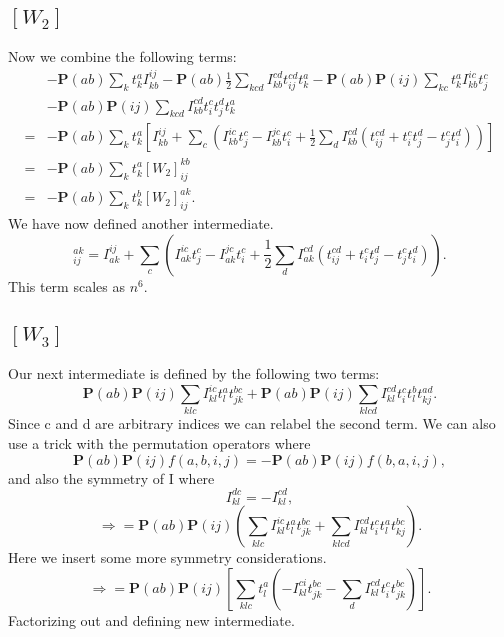 \documentclass[graybox,sectrefs,envcountresetchap,open=right]{svmonodo}
\begin{document}
\subsection{$[W_2]$}
Now we combine the following terms:
\begin{align}
& - \mathbf{P}(ab) \sum_k t_k^a I_{kb}^{ij}
- \mathbf{P}(ab) \frac{1}{2} \sum_{kcd} I_{kb}^{cd} t_{ij}^{cd} t_k^a
- \mathbf{P}(ab) \mathbf{P}(ij) \sum_{kc} t_k^a I_{kb}^{ic} t_j^c 
\nonumber \\
& - \mathbf{P}(ab) \mathbf{P}(ij) \sum_{kcd} I_{kb}^{cd} t_i^c t_j^d t_k^a
\nonumber \\
= &
- \mathbf{P}(ab) \sum_k t_k^a \left[
I_{kb}^{ij} 
+ \sum_c \left( I_{kb}^{ic} t_j^c
- I_{kb}^{jc} t_i^c
+ \frac{1}{2} \sum_{d} I_{kb}^{cd} (t_{ij}^{cd}
+ t_i^c t_j^d - t_j^c t_i^d
) \right) \right]
\nonumber \\
= &
- \mathbf{P}(ab) \sum_k t_k^a [W_2]_{ij}^{kb} \nonumber \\
= &
- \mathbf{P}(ab) \sum_k t_k^b [W_2]_{ij}^{ak} .
\end{align}
We have now defined another intermediate.
\begin{equation}
[W_2]_{ij}^{ak} = I_{ak}^{ij} 
+ \sum_c \left( I_{ak}^{ic} t_j^c
- I_{ak}^{jc} t_i^c
+ \frac{1}{2} \sum_{d} I_{ak}^{cd} (t_{ij}^{cd}
+ t_i^c t_j^d - t_j^c t_i^d
) \right) . \label{intermedW2}
\end{equation}
This term scales as $n^6$.

\subsection{$[W_3]$}
Our next intermediate is defined by the following two terms:
\begin{equation}
\mathbf{P}(ab) \mathbf{P}(ij) \sum_{klc} I_{kl}^{ic} t_l^a t_{jk}^{bc}
+ \mathbf{P}(ab) \mathbf{P}(ij) \sum_{klcd} I_{kl}^{cd} t_i^c t_l^b t_{kj}^{ad} .
\end{equation}
Since c and d are arbitrary indices we can relabel the second term. We can also use a trick with the permutation operators where
\begin{equation}
\mathbf{P}(ab) \mathbf{P}(ij) f(a,b,i,j) = 
- \mathbf{P}(ab) \mathbf{P}(ij) f(b,a,i,j) ,
\end{equation}
and also the symmetry of I where
\begin{equation}
I_{kl}^{dc} = - I_{kl}^{cd} ,
\end{equation}
\begin{equation}
\Rightarrow =
\mathbf{P}(ab) \mathbf{P}(ij) \left(
\sum_{klc} I_{kl}^{ic} t_l^a t_{jk}^{bc}
+ \sum_{klcd} I_{kl}^{cd} t_i^c t_l^a t_{kj}^{bc}
\right) .
\end{equation}
Here we insert some more symmetry considerations.
\begin{equation}
\Rightarrow =
\mathbf{P}(ab) \mathbf{P}(ij) \left[ \sum_{klc} t_l^a \left(
- I_{kl}^{ci} t_{jk}^{bc} - \sum_d I_{kl}^{cd} t_i^c t_{jk}^{bc} \right) \right] .
\end{equation}
Factorizing out and defining new intermediate.
\end{document}
